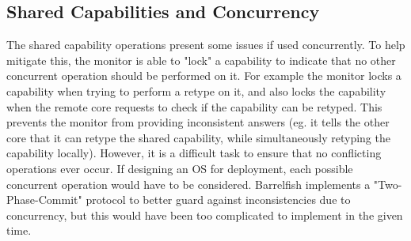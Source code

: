 \subsection{Shared Capabilities and Concurrency}

The shared capability operations present some issues if used concurrently. To help mitigate this, the monitor is able to "lock" a capability to indicate that no other concurrent operation should be performed on it. For example the monitor locks a capability when trying to perform a retype on it, and also locks the capability when the remote core requests to check if the capability can be retyped. This prevents the monitor from providing inconsistent answers (eg. it tells the other core that it can retype the shared capability, while simultaneously retyping the capability locally).
However, it is a difficult task to ensure that no conflicting operations ever occur. If designing an OS for deployment, each possible concurrent operation would have to be considered. Barrelfish implements a "Two-Phase-Commit" protocol to better guard against inconsistencies due to concurrency, but this would have been too complicated to implement in the given time.

